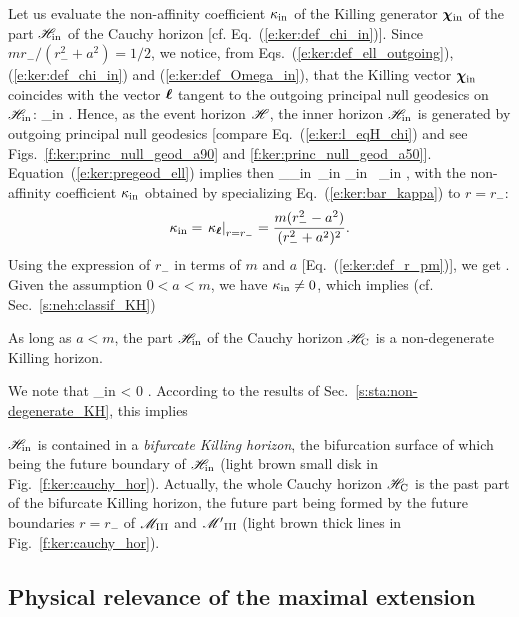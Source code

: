 Let us evaluate the non-affinity coefficient $\kappa_{\rm in}$ of the Killing
generator $\bm{\chi}_{\rm in}$ of the part $\mathscr{H}_{\rm in}$ of the
Cauchy horizon [cf. Eq.~(\ref{e:ker:def_chi_in})].
Since $m r_- /(r_-^2+a^2) = 1/2$,
we notice, from Eqs.~(\ref{e:ker:def_ell_outgoing}), (\ref{e:ker:def_chi_in}) and (\ref{e:ker:def_Omega_in}), that the Killing vector $\bm{\chi}_{\rm in}$ coincides with
the vector $\bm{\ell}$ tangent to the outgoing principal
null geodesics on $\mathscr{H}_{\rm in}$:
\be \label{e:ker:chi_in_ell}
    \w{\chi}_{\rm in}  \wl .
\ee
Hence, as the event horizon $\mathscr{H}$, the inner horizon $\mathscr{H}_{\rm in}$
is generated by outgoing principal null geodesics [compare Eq.~(\ref{e:ker:l_eqH_chi}) and
see Figs.~\ref{f:ker:princ_null_geod_a90} and \ref{f:ker:princ_null_geod_a50}].
Equation~(\ref{e:ker:pregeod_ell}) implies then
\be
     \wnab_{\w{\chi}_{\rm in}}\, \w{\chi}_{\rm in}  \kappa_{\rm in} \, \w{\chi}_{\rm in} ,
\ee
with the non-affinity coefficient $\kappa_{\rm in}$ obtained by specializing
Eq.~(\ref{e:ker:bar_kappa}) to $r=r_-$:
\[
    \kappa_{\rm in} = \left. \kappa_{\bm{\ell}} \right| _{r=r_-} =
    \frac{m(r_-^2-a^2)}{(r_-^2+a^2)^2} .
\]
Using the expression of $r_-$ in terms of $m$ and $a$ [Eq.~(\ref{e:ker:def_r_pm})], we get
\be
     .
\ee
Given the assumption $0<a<m$, we have $\kappa_{\rm in} \not=0$, which implies
(cf. Sec.~\ref{s:neh:classif_KH})
\begin{prop}
As long as $a<m$, the part $\mathscr{H}_{\rm in}$ of the Cauchy horizon $\mathscr{H}_{\rm C}$ is a non-degenerate Killing horizon.
\end{prop}
We note that
\be
    \kappa_{\rm in} < 0 .
\ee
According to the results of Sec.~\ref{s:sta:non-degenerate_KH}, this implies
\begin{prop}
$\mathscr{H}_{\rm in}$ is contained in a \emph{bifurcate Killing horizon}, the
bifurcation surface of which being the future boundary of $\mathscr{H}_{\rm in}$
(light brown small disk in Fig.~\ref{f:ker:cauchy_hor}).
Actually, the whole Cauchy horizon $\mathscr{H}_{\rm C}$ is the past part of the bifurcate Killing horizon,
the future part being formed by the future
boundaries $r=r_-$ of $\mathscr{M}_{\rm III}$ and ${\mathscr{M}'}_{\rm III}$ (light brown thick lines in Fig.~\ref{f:ker:cauchy_hor}).
\end{prop}

\subsection{Physical relevance of the maximal extension}


